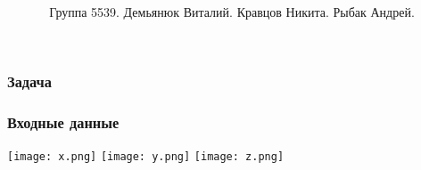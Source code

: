 \documentclass[17pt]{beamer}
\title{
}
\institute{Университет ИТМО}
\author{ Группа 5539. 
Демьянюк Виталий.
Кравцов Никита.
Рыбак Андрей.}
\date{}
\begin{document}
{
\fontsize{14pt}{14pt}\selectfont
{}
\begin{frame}
    \maketitle
\end{frame}
}

\begin{frame}
\frametitle{Задача}
\end{frame}

\begin{frame}
    \frametitle{Входные данные}
    \texttt{[image: x.png]}
    \texttt{[image: y.png]}
    \texttt{[image: z.png]}
\end{frame}
\begin{frame}

\end{frame}
\end{document}
